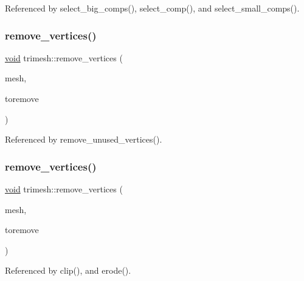 Referenced by select\+\_\+big\+\_\+comps(), select\+\_\+comp(), and select\+\_\+small\+\_\+comps().

\mbox{\label{namespacetrimesh_a84aeaf44b09ef93b6d49140b9d307ee8}} 
\subsubsection{\texorpdfstring{remove\+\_\+vertices()}{remove\_vertices()}\hspace{0.1cm}{\footnotesize\ttfamily [1/2]}}
{\footnotesize\ttfamily \hyperlink{namespacetrimesh_a784ddfd979e1c579bda795a8edfc3f43}{void} trimesh\+::remove\+\_\+vertices (\begin{DoxyParamCaption}\item[{\hyperlink{classtrimesh_1_1TriMesh}{Tri\+Mesh} $\ast$}]{mesh,  }\item[{const vector$<$ bool $>$ \&}]{toremove }\end{DoxyParamCaption})}



Referenced by remove\+\_\+unused\+\_\+vertices().

\mbox{\label{namespacetrimesh_a0fcaeb83417f32b5128881cb1076e7de}} 
\subsubsection{\texorpdfstring{remove\+\_\+vertices()}{remove\_vertices()}\hspace{0.1cm}{\footnotesize\ttfamily [2/2]}}
{\footnotesize\ttfamily \hyperlink{namespacetrimesh_a784ddfd979e1c579bda795a8edfc3f43}{void} trimesh\+::remove\+\_\+vertices (\begin{DoxyParamCaption}\item[{\hyperlink{classtrimesh_1_1TriMesh}{Tri\+Mesh} $\ast$}]{mesh,  }\item[{const \+::std\+::vector$<$ bool $>$ \&}]{toremove }\end{DoxyParamCaption})}



Referenced by clip(), and erode().

\mbox{\label{namespacetrimesh_a69f38c2c1647027b3c1b50e8244dc6e3}} 
